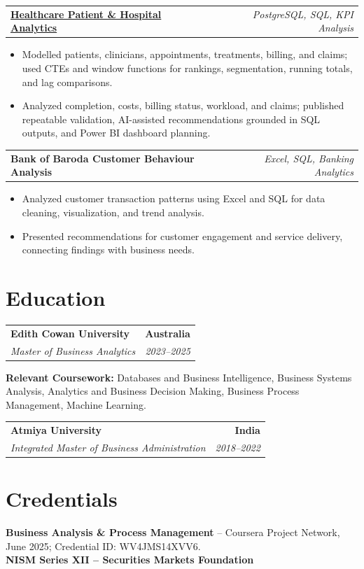 \documentclass[letterpaper,10pt]{article}
\makeatletter
\newcommand{\role}[4]{%
  \begin{tabularx}{\textwidth}{@{}Xr@{}}
    \textbf{#1} & \textbf{#2} \\
    \textit{#3} & \textit{#4}
  \end{tabularx}\vspace{-1pt}
}
\newcommand{\project}[2]{%
  \begin{tabularx}{\textwidth}{@{}Xr@{}}
    \textbf{#1} & \textit{#2}
  \end{tabularx}\vspace{-1pt}
}
\makeatother
\begin{document}
\project{\href{https://github.com/jainalimehta/Healthcare-Analytics}{Healthcare Patient \& Hospital Analytics}}{PostgreSQL, SQL, KPI Analysis}
\begin{itemize}
  \item Modelled patients, clinicians, appointments, treatments, billing, and claims; used CTEs and window functions for rankings, segmentation, running totals, and lag comparisons.
  \item Analyzed completion, costs, billing status, workload, and claims; published repeatable validation, AI-assisted recommendations grounded in SQL outputs, and Power BI dashboard planning.
\end{itemize}
\vspace{1pt}

\project{Bank of Baroda Customer Behaviour Analysis}{Excel, SQL, Banking Analytics}
\begin{itemize}
  \item Analyzed customer transaction patterns using Excel and SQL for data cleaning, visualization, and trend analysis.
  \item Presented recommendations for customer engagement and service delivery, connecting findings with business needs.
\end{itemize}

\section{Education}
\role{Edith Cowan University}{Australia}{Master of Business Analytics}{2023--2025}
\small\textbf{Relevant Coursework:} Databases and Business Intelligence, Business Systems Analysis, Analytics and Business Decision Making, Business Process Management, Machine Learning.\\[2pt]
\role{Atmiya University}{India}{Integrated Master of Business Administration}{2018--2022}

\section{Credentials}
\small\textbf{Business Analysis \& Process Management} -- Coursera Project Network, June 2025; Credential ID: WV4JMS14XVV6.\\[-0.2pt]
\small\textbf{NISM Series XII -- Securities Markets Foundation}
\end{document}
